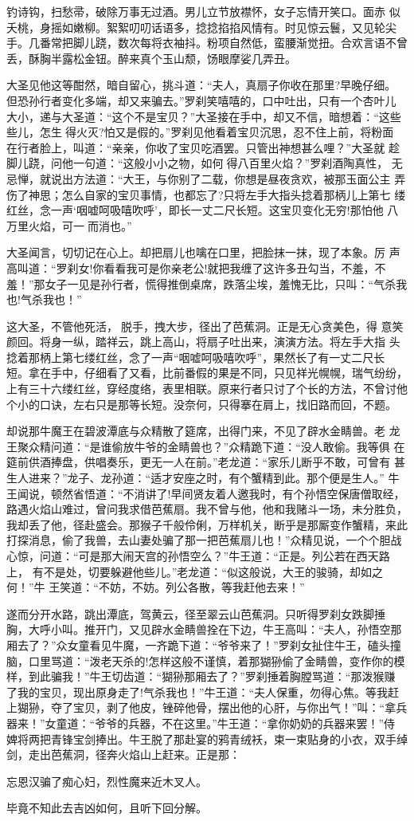 钓诗钩，扫愁帚，破除万事无过酒。男儿立节放襟怀，女子忘情开笑口。面赤
似夭桃，身摇如嫩柳。絮絮叨叨话语多，捻捻掐掐风情有。时见惊云鬟，又见轮尖
手。几番常把脚儿跷，数次每将衣袖抖。粉项自然低，蛮腰渐觉扭。合欢言语不曾
丢，酥胸半露松金钮。醉来真个玉山颓，饧眼摩娑几弄丑。

大圣见他这等酣然，暗自留心，挑斗道：“夫人，真扇子你收在那里?早晚仔细。
但恐孙行者变化多端，却又来骗去。”罗刹笑嘻嘻的，口中吐出，只有一个杏叶儿
大小，递与大圣道：“这个不是宝贝？”大圣接在手中，却又不信，暗想着：“这些
些儿，怎生得火灭?怕又是假的。”罗刹见他看着宝贝沉思，忍不住上前，将粉面
在行者脸上，叫道：“亲亲，你收了宝贝吃酒罢。只管出神想甚么哩？”大圣就
趁脚儿跷，问他一句道：“这般小小之物，如何得八百里火焰？”罗刹酒陶真性，
无忌惮，就说出方法道：“大王，与你别了二载，你想是昼夜贪欢，被那玉面公主
弄伤了神思；怎么自家的宝贝事情，也都忘了?只将左手大指头捻着那柄儿上第七
缕红丝，念一声‘咽嘘呵吸嘻吹呼’，即长一丈二尺长短。这宝贝变化无穷!那怕他
八万里火焰，可一而消也。”

大圣闻言，切切记在心上。却把扇儿也噙在口里，把脸抹一抹，现了本象。厉
声高叫道：“罗刹女!你看看我可是你亲老公!就把我缠了这许多丑勾当，不羞，不
羞！”那女子一见是孙行者，慌得推倒桌席，跌落尘埃，羞愧无比，只叫：“气杀我
也!气杀我也！”

这大圣，不管他死活，脱手，拽大步，径出了芭蕉洞。正是无心贪美色，得
意笑颜回。将身一纵，踏祥云，跳上高山，将扇子吐出来，演演方法。将左手大指
头捻着那柄上第七缕红丝，念了一声“咽嘘呵吸嘻吹呼”，果然长了有一丈二尺长
短。拿在手中，仔细看了又看，比前番假的果是不同，只见祥光幌幌，瑞气纷纷，
上有三十六缕红丝，穿经度络，表里相联。原来行者只讨了个长的方法，不曾讨他
个小的口诀，左右只是那等长短。没奈何，只得搴在肩上，找旧路而回，不题。

却说那牛魔王在碧波潭底与众精散了筵席，出得门来，不见了辟水金睛兽。老
龙王聚众精问道：“是谁偷放牛爷的金睛兽也？”众精跪下道：“没人敢偷。我等俱
在筵前供酒捧盘，供唱奏乐，更无一人在前。”老龙道：“家乐儿断乎不敢，可曾有
甚生人进来？”龙子、龙孙道：“适才安座之时，有个蟹精到此。那个便是生人。”
牛王闻说，顿然省悟道：“不消讲了!早间贤友着人邀我时，有个孙悟空保唐僧取经，
路遇火焰山难过，曾问我求借芭蕉扇。我不曾与他，他和我赌斗一场，未分胜负，
我却丢了他，径赴盛会。那猴子千般伶俐，万样机关，断乎是那厮变作蟹精，来此
打探消息，偷了我兽，去山妻处骗了那一把芭蕉扇儿也！”众精见说，一个个胆战
心惊，问道：“可是那大闹天宫的孙悟空么？”牛王道：“正是。列公若在西天路上，
有不是处，切要躲避他些儿。”老龙道：“似这般说，大王的骏骑，却如之何！”牛
王笑道：“不妨，不妨。列公各散，等我赶他去来！”

遂而分开水路，跳出潭底，驾黄云，径至翠云山芭蕉洞。只听得罗刹女跌脚捶
胸，大呼小叫。推开门，又见辟水金睛兽拴在下边，牛王高叫：“夫人，孙悟空那
厢去了？”众女童看见牛魔，一齐跪下道：“爷爷来了！”罗刹女扯住牛王，磕头撞
脑，口里骂道：“泼老天杀的!怎样这般不谨慎，着那猢狲偷了金睛兽，变作你的模
样，到此骗我！”牛王切齿道：“猢狲那厢去了？”罗刹捶着胸膛骂道：“那泼猴赚
了我的宝贝，现出原身走了!气杀我也！”牛王道：“夫人保重，勿得心焦。等我赶
上猢狲，夺了宝贝，剥了他皮，锉碎他骨，摆出他的心肝，与你出气！”叫：“拿兵
器来！”女童道：“爷爷的兵器，不在这里。”牛王道：“拿你奶奶的兵器来罢！”侍
婢将两把青锋宝剑捧出。牛王脱了那赴宴的鸦青绒袄，束一束贴身的小衣，双手绰
剑，走出芭蕉洞，径奔火焰山上赶来。正是那：

忘恩汉骗了痴心妇，烈性魔来近木叉人。

毕竟不知此去吉凶如何，且听下回分解。